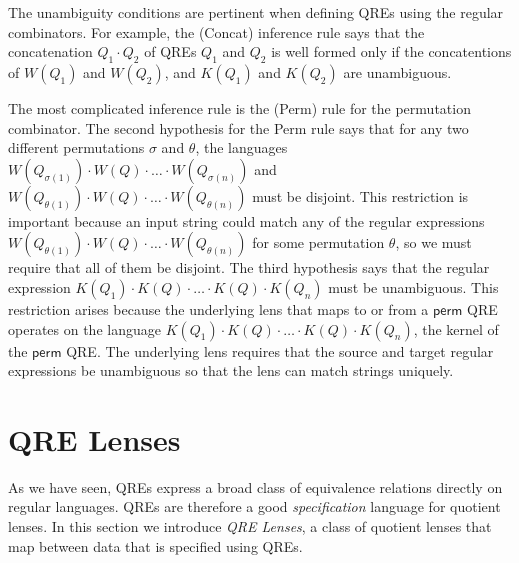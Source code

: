 \documentclass[acmsmall,review,anonymous]{acmart}
\newcommand{\kw}[1]{\textcolor{dkblue}{\ensuremath{\mathsf{#1}}}}
\begin{document}
The unambiguity conditions are pertinent when defining QREs using the
regular combinators. For example, the (Concat) inference rule 
says that the concatenation $Q_1 \cdot Q_2$ of QREs
$Q_1$ and $Q_2$ is well formed only if the concatentions of $W(Q_1)$
and $W(Q_2)$, and $K(Q_1)$ and $K(Q_2)$ are unambiguous.

The most complicated inference rule is the (Perm) rule for the
permutation combinator. The second hypothesis for the
Perm rule says that for any two different permutations $\sigma$
and $\theta$, the languages $W(Q_{\sigma(1)}) \cdot W(Q) \cdot \ldots \cdot
W(Q_{\sigma(n)})$ and $W(Q_{\theta(1)}) \cdot W(Q) \cdot \ldots \cdot
W(Q_{\theta(n)})$ must be disjoint. This restriction is important
because an input string could match any
of the regular expressions $W(Q_{\theta(1)}) \cdot
W(Q) \cdot \ldots \cdot W(Q_{\theta(n)})$ for some permutation $\theta$, so we
must require that all of them be disjoint.
%
The third hypothesis says that the regular expression $K(Q_1) \cdot K(Q)
\cdot \ldots \cdot K(Q) \cdot K(Q_n)$ must be unambiguous. This
restriction arises because the
underlying lens that maps to or from a \kw{perm} QRE operates on
the language $K(Q_1) \cdot K(Q) \cdot \ldots \cdot K(Q) \cdot K(Q_n)$, 
the kernel of the \kw{perm} QRE. The underlying
lens requires that the source and target regular expressions be
unambiguous so that the lens can match strings uniquely.


\section{QRE Lenses}
\label{QRE-lenses}
As we have seen, QREs express a broad class of equivalence relations
directly on regular languages. QREs are therefore a good \textit{specification}
language for quotient lenses. In this section we introduce \textit{QRE Lenses},
a class of quotient lenses that map between data that is specified using QREs.
\end{document}
